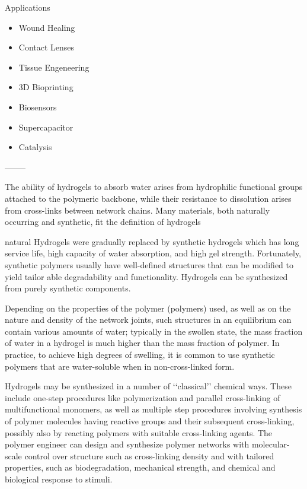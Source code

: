\documentclass[../../main-notes.tex]{subfiles}
\begin{document}
Applications 

\begin{itemize}
    \item Wound Healing
    \item Contact Lenses
    \item Tissue Engeneering
    \item 3D Bioprinting
    \item Biosensors
    \item Supercapacitor
    \item Catalysis
\end{itemize}

--------


\citep{ahmedHydrogelPreparationCharacterization2015a}

The ability of hydrogels to absorb water arises from hydrophilic functional groups attached to the polymeric backbone, while their resistance to dissolution arises from cross-links between network chains. 
Many materials, both naturally occurring and synthetic, fit the definition of hydrogels

natural Hydrogels were gradually replaced by synthetic hydrogels which has long service life, high capacity of water absorption, and high gel strength. Fortunately, synthetic polymers usually have well-defined structures that can be modified to yield tailor able degradability and functionality. 
Hydrogels can be synthesized from purely synthetic components.

 
Depending on the properties of the polymer (polymers) used, as well as on the nature and density of the network joints, such structures in an equilibrium can contain various amounts of water; 
typically in the swollen state, the mass fraction of water in a hydrogel is much higher than the mass fraction of polymer. 
In practice, to achieve high degrees of swelling, it is common to use synthetic polymers that are water-soluble when in non-cross-linked form.

Hydrogels may be synthesized in a number of ‘‘classical’’ chemical ways. 
These include one-step procedures like polymerization and parallel cross-linking of multifunctional monomers, as well as multiple step procedures involving synthesis of polymer molecules having reactive groups and their subsequent cross-linking, possibly also by reacting polymers with suitable cross-linking agents. 
The polymer engineer can design and synthesize polymer networks with molecular-scale control over structure such as cross-linking density and with tailored properties, such as biodegradation, mechanical strength, and chemical and biological response to stimuli.
\end{document}
